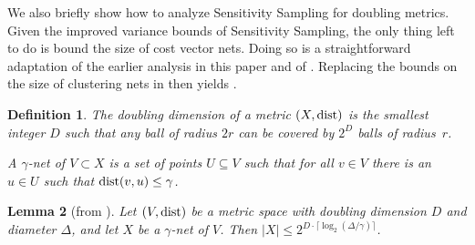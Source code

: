\documentclass[11pt]{article}
\newtheorem{lemma}{Lemma}[section]
\newtheorem{definition}[lemma]{Definition}
\theoremstyle{restate}
\theoremstyle{definition}
\newcommand{\dist}{\textnormal{dist}}
\begin{document}
We also briefly show how to analyze Sensitivity Sampling for doubling metrics. 
Given the improved variance bounds of Sensitivity Sampling, the only thing left to do is bound the size of cost vector nets. Doing so is a straightforward adaptation of the earlier analysis in this paper and of \cite{CSS21}. Replacing the bounds on the size of clustering nets in  then yields .
\begin{definition}
The \emph{doubling dimension} of a metric $(X,\dist)$ is the smallest integer $D$ such that any
ball of radius $2r$ can be covered by $2^D$ balls of radius~$r$. 

A $\gamma$-\emph{net} of $V\subset X$ is a set of points $U\subseteq V$ such that for all
$v \in V$ there is an $u \in U$ such that $\dist(v, u) \leq \gamma$.
\end{definition}
\begin{lemma}[from \cite{GuptaKL03}]\label{prop:doub:net}
Let $(V, \dist)$ be a metric space with doubling dimension $D$ and diameter 
$\Delta$, and let $X$ be a $\gamma$-net of $V$. Then $|X| \leq 2^{D \cdot 
\lceil \log_2 (\Delta/\gamma)\rceil}$.
\end{lemma}




    
\end{document}
